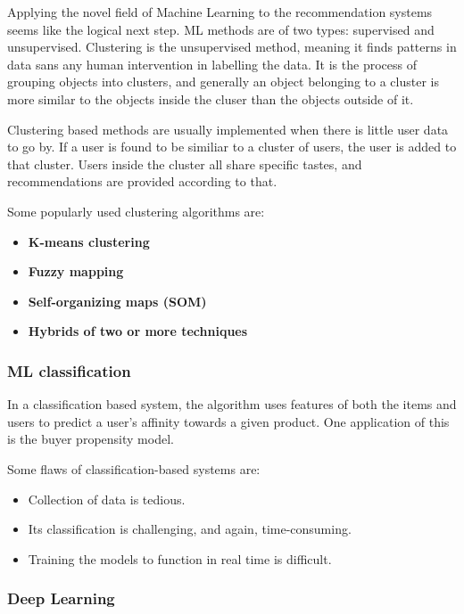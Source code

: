 \documentclass{article}
\begin{document}
Applying the novel field of Machine Learning to the recommendation systems seems like the logical next step. ML methods are of two types: supervised and unsupervised. Clustering is the unsupervised method, meaning it finds patterns in data sans any human intervention in labelling the data. It is the process of grouping objects into clusters, and generally an object belonging to a cluster is more similar to the objects inside the cluser than the objects outside of it.

\medskip

Clustering based methods are usually implemented when there is little user data to go by. If a user is found to be similiar to a cluster of users, the user is added to that cluster. Users inside the cluster all share specific tastes, and recommendations are provided according to that.

\medskip

Some popularly used clustering algorithms are:

\begin{itemize}
	\item{\textbf{K-means clustering}}
	\item{\textbf{Fuzzy mapping}}
	\item{\textbf{Self-organizing maps (SOM)}}
	\item{\textbf{Hybrids of two or more techniques}}
\end{itemize}

\subsubsection{ML classification}

In a classification based system, the algorithm uses features of both the items and users to predict a user's affinity towards a given product. One application of this is the buyer propensity model.

\medskip

Some flaws of classification-based systems are:

\begin{itemize}
    \item{Collection of data is tedious.}
    \item{Its classification is challenging, and again, time-consuming.}
    \item{Training the models to function in real time is difficult.}
\end{itemize}

\subsubsection{Deep Learning}
\end{document}
